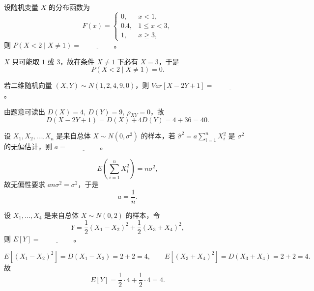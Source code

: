 \documentclass[lang=cn,11pt]{elegantbook}
\begin{document}
\begin{exercise}
\par
设随机变量 \(X\) 的分布函数为
\[
F(x)=
\begin{cases}
0, & x<1,\\
0.4, & 1\le x<3,\\
1, & x\ge3,
\end{cases}
\]
则 \(P(X<2\mid X\neq1)=\underline{\hspace{2cm}}\)。
\end{exercise}

\begin{solution}
\par
\(X\) 只可能取 \(1\) 或 \(3\)，故在条件 \(X\neq1\) 下必有 \(X=3\)，于是
\[
P(X<2\mid X\neq1)=0.
\]
\end{solution}

\begin{exercise}
\par
若二维随机向量 \((X,Y)\sim N(1,2,4,9,0)\)，则 \(Var[X-2Y+1]=\underline{\hspace{2cm}}\)。
\end{exercise}

\begin{solution}
\par
由题意可读出 \(D(X)=4,\ D(Y)=9,\ \rho_{XY}=0\)，故
\[
D(X-2Y+1)=D(X)+4D(Y)=4+36=40.
\]
\end{solution}

\begin{exercise}
\par
设 \(X_1,X_2,\dots,X_n\) 是来自总体 \(X\sim N(0,\sigma^2)\) 的样本，若 \(\hat{\sigma}^2=a\sum_{i=1}^n X_i^2\) 是 \(\sigma^2\) 的无偏估计，则 \(a=\underline{\hspace{2cm}}\)。
\end{exercise}

\begin{solution}
\par
\[
E\!\left(\sum_{i=1}^n X_i^2\right)=n\sigma^2,
\]
故无偏性要求 \(an\sigma^2=\sigma^2\)，于是
\[
a=\frac1n.
\]
\end{solution}

\begin{exercise}
\par
设 \(X_1,\dots,X_4\) 是来自总体 \(X\sim N(0,2)\) 的样本，令
\[
Y=\frac12(X_1-X_2)^2+\frac12(X_3+X_4)^2,
\]
则 \(E[Y]=\underline{\hspace{2cm}}\)。
\end{exercise}

\begin{solution}
\par
\[
E[(X_1-X_2)^2]=D(X_1-X_2)=2+2=4,
\qquad
E[(X_3+X_4)^2]=D(X_3+X_4)=2+2=4.
\]
故
\[
E[Y]=\frac12\cdot4+\frac12\cdot4=4.
\]
\end{solution}
\end{document}
